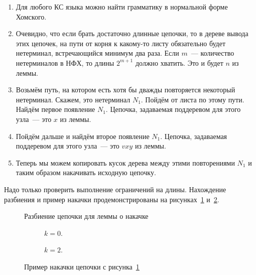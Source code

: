 \begin{proofSketch}
    \begin{enumerate}
        \item Для любого КС языка можно найти грамматику в нормальной форме Хомского.
        \item Очевидно, что если брать достаточно длинные цепочки, то в дереве вывода этих цепочек, на пути от корня к какому-то листу обязательно будет нетерминал, встречающийся минимум два раза. Если $m$~--- количество нетерминалов в НФХ, то длины $2^{m+1}$ должно хватить. Это и будет $n$ из леммы.
        \item Возьмём путь, на котором есть хотя бы дважды повторяется некоторый нетерминал. Скажем, это нетерминал  $N_1$. Пойдём от листа по этому пути. Найдём первое появление $N_1$. Цепочка, задаваемая поддеревом для этого узла~--- это $x$ из леммы.
        \item Пойдём дальше и найдём второе появление $N_1$. Цепочка, задаваемая поддеревом для этого узла~--- это $vxy$ из леммы.
        \item Теперь мы можем копировать кусок дерева между этими повторениями $N_1$ и таким образом накачивать исходную цепочку.
    \end{enumerate}
    Надо только проверить выполнение ограничений на длины.
    Нахождение разбиения и пример накачки продемонстрированы на рисунках~\ref{fig:pumping1} и~\ref{fig:pumping2}.
\end{proofSketch}

\begin{figure}
    \centering
    
    \caption{Разбиение цепочки для леммы о накачке}
    \label{fig:pumping1}
\end{figure}

\begin{figure}
    \centering
    \begin{subfigure}[b]{0.4\textwidth}
        \centering
        
        \caption{$k = 0$.}
    \end{subfigure}
    \hfill
    \begin{subfigure}[b]{0.4\textwidth}
        \centering
        
        \caption{$k = 2$.}
    \end{subfigure}
    \caption{Пример накачки цепочки с рисунка~\ref{fig:pumping1}}
    \label{fig:pumping2}
\end{figure}

